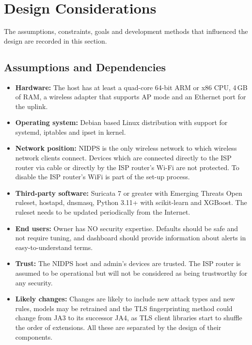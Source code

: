\section{Design Considerations}\label{sec:6.2}
\label{sec:designconsiderations}
\noindent The assumptions, constraints, goals and development methods that influenced the design are recorded in this section.

\subsection{Assumptions and Dependencies}\label{sec:6.2.1}
\label{sec:assumptions}
\begin{itemize}
    \item \textbf{Hardware:} The host has at least a quad-core 64-bit ARM or x86 CPU, 4\,GB of RAM, a wireless adapter that supports AP mode and an Ethernet port for the uplink.
    \item \textbf{Operating system:} Debian based Linux distribution with support for systemd, iptables and ipset in kernel.
    \item \textbf{Network position:} NIDPS is the only wireless network to which wireless network clients connect. Devices which are connected directly to the ISP router via cable or directly by the ISP router's Wi-Fi are not protected. To disable the ISP router's WiFi is part of the set-up process.
    \item \textbf{Third-party software:} Suricata 7 or greater with Emerging Threats Open ruleset, hostapd, dnsmasq, Python 3.11+ with scikit-learn and XGBoost. The ruleset needs to be updated periodically from the Internet.
    \item \textbf{End users:} Owner has NO security expertise. Defaults should be safe and not require tuning, and dashboard should provide information about alerts in easy-to-understand terms.
    \item \textbf{Trust:} The NIDPS host and admin's devices are trusted. The ISP router is assumed to be operational but will not be considered as being trustworthy for any security.
    \item \textbf{Likely changes:} Changes are likely to include new attack types and new rules, models may be retrained and the TLS fingerprinting method could change from JA3 to its successor JA4, as TLS client libraries start to shuffle the order of extensions. All these are separated by the design of their components.
\end{itemize}

